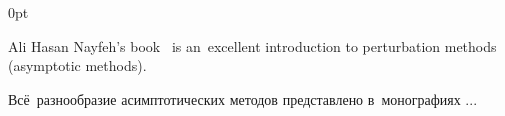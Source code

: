\section*{\small \wordforbibliography}

\begin{changemargin}{\parindent}{0pt}
\fontsize{10}{12}\selectfont

\begin{otherlanguage}{russian}

Ali Hasan Nayfeh’s book~\cite{nayfeh-perturbation} is an~excellent introduction to perturbation methods (asymptotic methods).

Всё~разнообразие асимптотических методов представлено в~монографиях ...

\end{otherlanguage}

\end{changemargin}
